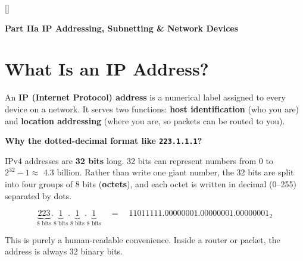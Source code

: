 \documentclass[11pt, letterpaper]{article}
\newcommand{\bluesections}{%
  \titleformat{\section}{\large\bfseries\color{sectionblue}}{}{0em}{}[\color{sectionblue}\titlerule]%
  \titleformat{\subsection}{\normalsize\bfseries\color{sectionblue!80!black}}{}{0em}{}%
}
\newcommand{\partbanner}[3]{%
  \begin{tcolorbox}[colback=#1, colframe=#2, boxrule=1.2pt, arc=4pt,
    left=8pt, right=8pt, top=6pt, bottom=6pt]
    \begin{center}{\LARGE\bfseries #3}\end{center}
  \end{tcolorbox}%
}
\begin{document}
\newpage

\bluesections
{}
\partbanner{partbg}{sectionblue}{Part IIa \quad IP Addressing, Subnetting \& Network Devices}

\vspace{8pt}

\section*{What Is an IP Address?}

An \textbf{IP (Internet Protocol) address} is a numerical label assigned to every device on
a network. It serves two functions: \textbf{host identification} (who you are) and
\textbf{location addressing} (where you are, so packets can be routed to you).

\textbf{Why the dotted-decimal format like \texttt{223.1.1.1}?}

IPv4 addresses are \textbf{32 bits} long. 32 bits can represent numbers from 0 to
$2^{32}-1 \approx$ 4.3 billion. Rather than write one giant number, the 32 bits are split
into four groups of 8 bits (\textbf{octets}), and each octet is written in decimal
(0--255) separated by dots.

\[
  \underbrace{223}_{8\text{ bits}}
  .\underbrace{1}_{8\text{ bits}}
  .\underbrace{1}_{8\text{ bits}}
  .\underbrace{1}_{8\text{ bits}}
  \quad = \quad
  11011111.00000001.00000001.00000001_2
\]

This is purely a human-readable convenience. Inside a router or packet, the address is
always 32 binary bits.
\end{document}
